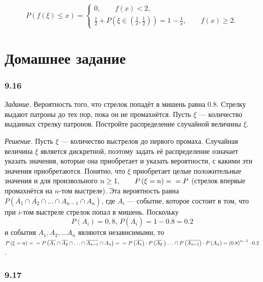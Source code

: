 \begin{enumerate}[label=\alph*)]
$$P \left( f \left( \xi \right) \leq x \right) =
\begin{cases}
0, \qquad f \left( x \right) < 2, \\
\frac{1}{2} + P \left( \xi \in \left( \frac{1}{x}, \frac{1}{2} \right) \right) =
1 - \frac{1}{x}, \qquad f \left( x \right) \geq 2.
\end{cases}$$
\end{enumerate}

\section*{Домашнее задание}

\subsubsection*{9.16}

\textit{Задание.} Вероятность того, что стрелок попадёт в мишень равна $0.8$.
Стрелку выдают патроны до тех пор, пока он не промахнётся.
Пусть $ \xi $ --- количество выданных стрелку патронов.
Постройте распределение случайной величины $ \xi $.

\textit{Решение.} Пусть $ \xi $ --- количество выстрелов до первого промаха.
Случайная величина $ \xi $ является дискретной,
поэтому задать её распределение означает указать значения, которые она приобретает и указать вероятности, с какими эти значения приобретаются.
Понятно, что $ \xi $ приобретает целые положительные значения и для произвольного $n \geq 1, \qquad P \left( \xi = n \right) = \\
= P$
(стрелок впервые промахнётся на $n$-том выстреле).
Эта вероятность равна $P \left( \overline{A_1} \cap \overline{A_2} \cap \dotsc \cap \overline{A_{n-1}} \cap A_n \right) $,
где $A_i$ --- событие, которое состоит в том, что при $i$-том выстреле стрелок попал в мишень.
Поскольку
$$P \left( A_i \right) = 0,8, \,
P \left( \overline{A_i} \right) = 1 - 0.8 = 0.2$$
и события $A_1, A_2, \dotsc A_n$ являются независимыми,
то
$P \left( \xi = n \right) = \\
= P \left( \overline{A_1} \cap \overline{A_2} \cap \dotsc \cap \overline{A_{n-1}} \cap A_n \right) = \\
= P \left( \overline{A_1} \right) \cdot P \left( \overline{A_2} \cdot \right) \dotsc \cap P \left( \overline{A_{n-1}} \right) \cdot P \left( A_n \right) =
\left( 0.8 \right)^{n-1} \cdot 0.2$.

\subsubsection*{9.17}

